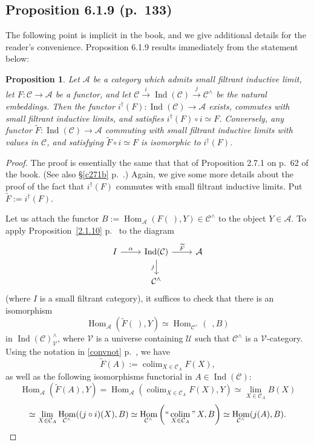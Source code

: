 \documentclass[12pt]{article}%
\newtheorem{prop}[thm]{Proposition}
\theoremstyle{remark}
\theoremstyle{definition}
\newcommand{\A}{\mathcal A}
\newcommand{\C}{\mathcal C}
\newcommand{\U}{\mathcal U}
\newcommand{\V}{\mathcal V}
\DeclareMathOperator*{\colim}{colim}
\DeclareMathOperator*{\icolim}{``\colim"}
\DeclareMathOperator{\Hom}{Hom}%
\DeclareMathOperator{\Ind}{Ind}
\begin{document}

\subsection{Proposition 6.1.9 (p.~133)}\label{619}

The following point is implicit in the book, and we give additional details for the reader's convenience. Proposition 6.1.9 results immediately from the statement below:

\begin{prop} 
Let $\A$ be a category which admits small filtrant inductive limit, let $F:\C\to\A$ be a functor, and let $\C\overset{i}{\to}\Ind(\C)\overset{j}{\to}\C^\wedge$ be the natural embeddings. Then the functor $i^\dagger(F):\Ind(\C)\to\A$ exists, commutes with small filtrant inductive limits, and satisfies $i^\dagger(F)\circ i\simeq F$. Conversely, any functor $\widetilde F:\Ind(\C)\to\A$ commuting with small filtrant inductive limits with values in $\C$, and satisfying $\widetilde F\circ i\simeq F$ is isomorphic to $i^\dagger(F)$. 
\end{prop} 
%
\begin{proof}
The proof is essentially the same that that of Proposition 2.7.1 on p.~62 of the book. (See also \S\ref{c271b} p.~\pageref{c271b}.) Again, we give some more details about the proof of the fact that $i^\dagger(F)$ commutes with small filtrant inductive limits. Put $\widetilde F:=i^\dagger(F)$. 

Let us attach the functor $B:=\Hom_\A(F(\ ),Y)\in\C^\wedge$ to the object $Y\in\A$. To apply Proposition~\ref{2.1.10} p.~\pageref{2.1.10} to the diagram 
$$
\begin{tikzcd}
I\ar{r}{\alpha}&\Ind(\C)\ar{d}[swap]{j}\ar{r}{\widetilde F}&\A\\
&\C^\wedge
\end{tikzcd}
$$
(where $I$ is a small filtrant category), it suffices to check that there is an isomorphism 
$$
\Hom_\A\left(\widetilde F(\ ),Y\right)\simeq
\Hom_{\C^\wedge}(\ \ ,B)
$$ 
in $\Ind(\C)^\wedge_\V$, where $\V$ is a universe containing $\U$ such that $\C^\wedge$ is a $\V$-category. Using the notation in \eqref{convnot} p.~\pageref{convnot}, we have 
$$
\widetilde F(A):=\colim_{X\in\C_A}F(X),
$$ 
as well as the following isomorphisms functorial in $A\in\Ind(\C)$:
$$
\Hom_\A\left(\widetilde F(A),Y\right)=
\Hom_\A\left(\colim_{X\in\C_A}F(X),Y\right)\simeq
\lim_{X\in\C_A}B(X)
$$
$$
\simeq
\lim_{X\in\C_A}\Hom_{\C^\wedge}((j\circ i)(X),B)
\simeq
\Hom_{\C^\wedge}\left(\icolim_{X\in\C_A}X,B\right)\simeq
\Hom_{\C^\wedge}(j(A),B).
$$
\end{proof}
\end{document}
